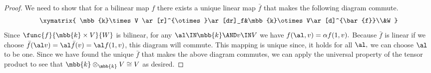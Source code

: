 \documentclass[../../main]{subfiles}
\begin{document}
\begin{proof}
We need to show that for a bilinear map $ f $ there exists a unique linear map 
$ \bar{f} $ that makes the following diagram commute.
$$
\xymatrix{ \mbb{k}\times V \ar[r]^{\otimes}\ar[dr]_f&\mbb{k}\otimes V\ar[d]^{\bar{f}}\\&W	
}
$$
Since $ \func{f}{\mbb{k}\times V}{W} $ is bilinear, for any $ \al\IN\mbb{k}\AND 
v\IN V  $ we have $ f(\al,v) =\alpha f(1,v).$ Because $ \bar{f} $ is linear if we choose $ \bar{f}(\al v)=\al 
\bar{f}(v)=\al f(1,v) $, this diagram will commute. This mapping is 
unique since, it holds for all $ \al,$ we can choose $ \al $ to be one. Since 
we have found the unique $ \bar{f} $ that makes the above diagram commutes,
we can apply the universal property of the tensor product to see that $ 
\mbb{k}\otimes_{\mbb{k}} V\cong V $ as desired. 


\end{proof}
\end{document}
